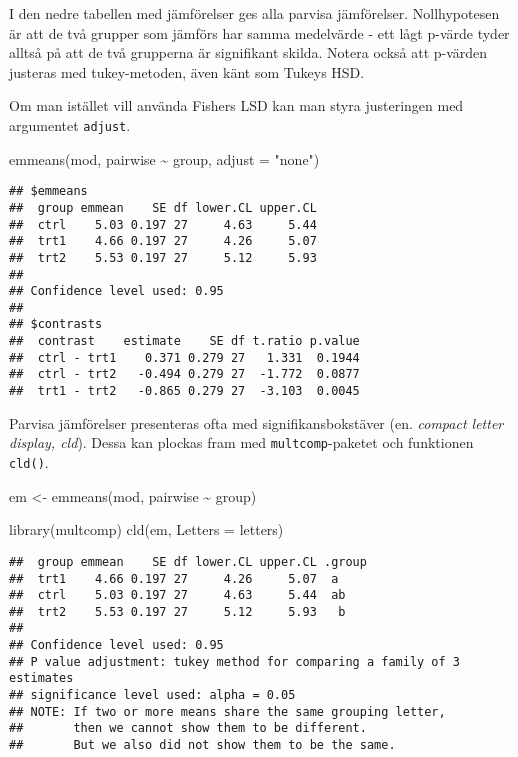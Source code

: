 \documentclass[
]{book}
\newenvironment{Shaded}{\begin{snugshade}}{\end{snugshade}}
\newcommand{\AttributeTok}[1]{\textcolor[rgb]{0.77,0.63,0.00}{#1}}
\newcommand{\FunctionTok}[1]{\textcolor[rgb]{0.00,0.00,0.00}{#1}}
\newcommand{\NormalTok}[1]{#1}
\newcommand{\OtherTok}[1]{\textcolor[rgb]{0.56,0.35,0.01}{#1}}
\newcommand{\SpecialCharTok}[1]{\textcolor[rgb]{0.00,0.00,0.00}{#1}}
\newcommand{\StringTok}[1]{\textcolor[rgb]{0.31,0.60,0.02}{#1}}
\theoremstyle{definition}
\theoremstyle{definition}
\theoremstyle{definition}
\theoremstyle{definition}
\theoremstyle{remark}
\begin{document}
I den nedre tabellen med jämförelser ges alla parvisa jämförelser. Nollhypotesen är att de två grupper som jämförs har samma medelvärde - ett lågt p-värde tyder alltså på att de två grupperna är signifikant skilda. Notera också att p-värden justeras med tukey-metoden, även känt som Tukeys HSD.

Om man istället vill använda Fishers LSD kan man styra justeringen med argumentet \texttt{adjust}.

\begin{Shaded}
\begin{Highlighting}[]
\FunctionTok{emmeans}\NormalTok{(mod, pairwise }\SpecialCharTok{\textasciitilde{}}\NormalTok{ group, }\AttributeTok{adjust =} \StringTok{"none"}\NormalTok{)}
\end{Highlighting}
\end{Shaded}

\begin{verbatim}
## $emmeans
##  group emmean    SE df lower.CL upper.CL
##  ctrl    5.03 0.197 27     4.63     5.44
##  trt1    4.66 0.197 27     4.26     5.07
##  trt2    5.53 0.197 27     5.12     5.93
## 
## Confidence level used: 0.95 
## 
## $contrasts
##  contrast    estimate    SE df t.ratio p.value
##  ctrl - trt1    0.371 0.279 27   1.331  0.1944
##  ctrl - trt2   -0.494 0.279 27  -1.772  0.0877
##  trt1 - trt2   -0.865 0.279 27  -3.103  0.0045
\end{verbatim}

Parvisa jämförelser presenteras ofta med signifikansbokstäver (en. \emph{compact letter display, cld}). Dessa kan plockas fram med \texttt{multcomp}-paketet och funktionen \texttt{cld()}.

\begin{Shaded}
\begin{Highlighting}[]
\NormalTok{em }\OtherTok{\textless{}{-}} \FunctionTok{emmeans}\NormalTok{(mod, pairwise }\SpecialCharTok{\textasciitilde{}}\NormalTok{ group)}

\FunctionTok{library}\NormalTok{(multcomp)}
\FunctionTok{cld}\NormalTok{(em, }\AttributeTok{Letters =}\NormalTok{ letters)}
\end{Highlighting}
\end{Shaded}

\begin{verbatim}
##  group emmean    SE df lower.CL upper.CL .group
##  trt1    4.66 0.197 27     4.26     5.07  a    
##  ctrl    5.03 0.197 27     4.63     5.44  ab   
##  trt2    5.53 0.197 27     5.12     5.93   b   
## 
## Confidence level used: 0.95 
## P value adjustment: tukey method for comparing a family of 3 estimates 
## significance level used: alpha = 0.05 
## NOTE: If two or more means share the same grouping letter,
##       then we cannot show them to be different.
##       But we also did not show them to be the same.
\end{verbatim}
\end{document}
